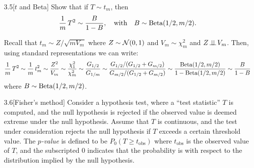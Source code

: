 \documentclass{pset}
\begin{document}
\begin{problem}{3.5}[$t$ and Beta]
  Show that if $T \sim t_m$, then
  \[\frac{1}{m}\, T^2 \sim \frac{B}{1-B}, \quad\textrm{with}\quad B\sim \textrm{Beta}(1 /2, m /2).\]
\end{problem}

\begin{solution}
  Recall that $t_m\sim Z / \sqrt{m V_m}$ where $Z\sim \mathcal{N}(0,1)$ and $V_m \sim \chi^2_m$ and $Z\!\perp\!\!\!\perp\! V_m$. Then, using standard representations we can write:
  \[
    \frac{1}{m}\, T^2 \sim \frac{1}{m}\,t_m^2 \sim \frac{Z^2}{V_m} \sim \frac{\chi_1^2}{\chi_m^2} \sim \frac{G_{1 /2}}{G_{1 /m}} \sim \frac{G_{1/2} / (G_{1/2} + G_{m / 2})}{G_{m /2} / (G_{1/2} + G_{m/2})} \sim \frac{\textrm{Beta}(1/2, m/2)}{1- \textrm{Beta}(1/2, m/2)}\sim \frac{B}{1-B}
  \]
  where $B\sim \textrm{Beta}(1/2, m/2)$.
\end{solution}

\begin{problem}{3.6}[Fisher's method]
  Consider a hypothesis test, where a ``test statistic'' $T$ is computed, and the null hypothesis is rejected if the observed value is deemed extreme under the null hypothesis. Assume that $T$ is continuous, and the test under consideration rejects the null hypothesis if $T$ exceeds a certain threshold value. The \emph{$p$-value} is defined to be $P_0(T\geq t_{\textrm{obs}})$ where $t_{\textrm{obs}}$ is the observed value of $T$, and the subscripted $0$ indicates that the probability is with respect to the distribution implied by the null hypothesis.
\end{problem}
\end{document}
